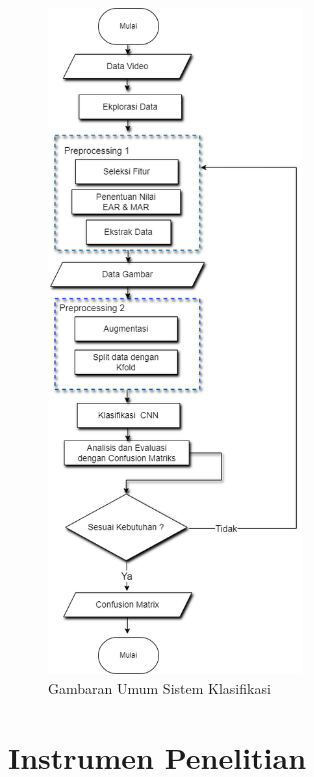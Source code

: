     \begin{figure}[H]
      \centering
      \includegraphics[width=0.6\textwidth]{figures/bab3/1flowchart.png}
      \caption{Gambaran Umum Sistem Klasifikasi}
      \label{flowchart}
      \medskip %
      \begin{minipage}{0.8\textwidth}
        \centering

      \end{minipage}
    \end{figure}


    

\section{Instrumen Penelitian}

